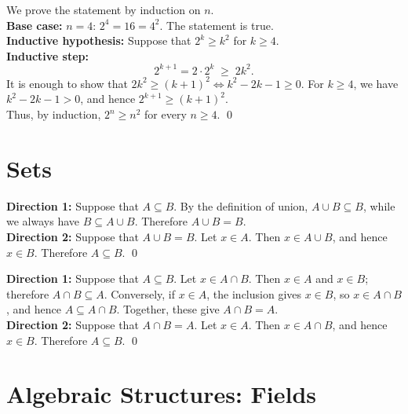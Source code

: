 {
We prove the statement by induction on \(n\).\\
\textbf{Base case:} \(n=4\): \(2^4=16=4^2\). The statement is true.\\
\textbf{Inductive hypothesis:} Suppose that \(2^k\ge k^2\) for \(k\ge 4\).\\
\textbf{Inductive step:}
\[
2^{k+1}=2\cdot 2^k \;\ge\; 2k^2.
\]
It is enough to show that \(2k^2\ge (k+1)^2 \iff k^2-2k-1\ge 0\).
For \(k\ge 4\), we have \(k^2-2k-1>0\), and hence \(2^{k+1}\ge (k+1)^2\).\\
Thus, by induction, \(2^{n}\ge n^{2}\) for every \(n\ge 4\).
}
\qed

\section{Sets}


{
\textbf{Direction 1:} Suppose that $A \subseteq B$. By the definition of union, $A \cup B \subseteq B$, while we always have $B \subseteq A \cup B$. Therefore $A \cup B = B$.\\
\textbf{Direction 2:} Suppose that $A \cup B = B$. Let $x \in A$. Then $x \in A \cup B$, and hence $x \in B$. Therefore $A \subseteq B$.
}
\qed

{
\textbf{Direction 1:} Suppose that $A \subseteq B$. Let $x \in A \cap B$. Then $x \in A$ and $x \in B$; therefore $A \cap B \subseteq A$. Conversely, if $x \in A$, the inclusion gives $x \in B$, so $x \in A \cap B$, and hence $A \subseteq A \cap B$. Together, these give $A \cap B = A$.\\[0.3em]
\textbf{Direction 2:} Suppose that $A \cap B = A$. Let $x \in A$. Then $x \in A \cap B$, and hence $x \in B$. Therefore $A \subseteq B$.
}
\qed

\section{Algebraic Structures: Fields}
